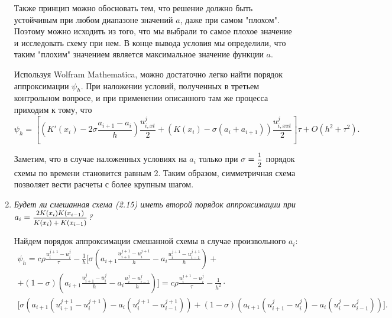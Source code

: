 \documentclass[12pt, a4paper]{article}
\begin{document}
\begin{enumerate}
		Также принцип можно обосновать тем, что решение должно быть устойчивым при любом диапазоне значений $a$, даже при самом "плохом". Поэтому можно исходить из того, что мы выбрали то самое плохое значение и исследовать схему при нем. В конце вывода условия мы определили, что таким "плохим" значением является максимальное значение функции $a$.
		

		
		Используя Wolfram Mathematica, можно достаточно легко найти порядок аппроксимации $\psi_h$. При наложении условий, полученных в третьем контрольном вопросе, и при применении описанного там же процесса приходим к тому, что
		\[
		\psi_h = \left[ \left( K'(x_i) - 2\sigma\frac{a_{i+1}-a_i}h \right) \frac{u_{i, xt}^j}2 + \left(K(x_i) - \sigma(a_i + a_{i+1})\right) \frac{u_{i, xxt}^j}2\right]\tau + O(h^2 + \tau^2).
		\]
		
		Заметим, что в случае наложенных условиях на $a_i$ только при $\sigma = \hbox{\footnotesize$\displaystyle\frac{1}{2}$}$ порядок схемы по времени становится равным 2. Таким образом, симметричная схема позволяет вести расчеты с более крупным шагом.
		
		\item \textit{Будет ли смешанная схема (2.15) иметь второй порядок аппроксимации при\\ $a_i=\hbox{\footnotesize$\displaystyle\frac{2K(x_i)K(x_{i-1})}{K(x_i)+K(x_{i-1})}$}$?}
		\smallskip
		
		Найдем порядок аппроксимации смешанной схемы в случае произвольного $a_i$:
		\begin{multline*}
			\psi_h = c \rho \frac{u_i^{j+1}-u_i^j}\tau - \frac1h\Bigg[\sigma\left(a_{i+1}\frac{u_{i+1}^{j+1}-u_i^{j+1}}h - a_i\frac{u_i^{j+1}-u_{i-1}^{j+1}}h\right) + \\
			+(1-\sigma)\left(a_{i+1}\frac{u_{i+1}^j - u_i^j}h - a_i \frac{u_i^j - u_{i-1}^j}h\right)\Bigg] = c \rho \frac{u_i^{j+1}-u_i^j}\tau - \frac1{h^2} \cdot \\
			\Big[\sigma \left(a_{i+1}(u_{i+1}^{j+1}-u_i^{j+1}) - a_i(u_i^{j+1}-u_{i-1}^{j+1})\right) + (1-\sigma)\left(a_{i+1}(u_{i+1}^j - u_i^j) - a_i (u_i^j - u_{i-1}^j)\right)\Big].
		\end{multline*}
		

\end{enumerate}
\end{document}
